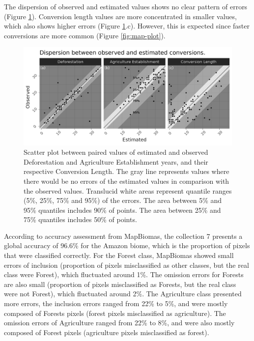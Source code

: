 \documentclass[essd, manuscript]{copernicus}
\begin{document}
The dispersion of observed and estimated values shows no clear pattern of errors (Figure \ref{fig:errorscatter-plot}).
Conversion length values are more concentrated in smaller values, which also shows higher errors (Figure \ref{fig:errorscatter-plot}.c).
However, this is expected since faster conversions are more common (Figure \ref{fig:map-plot}).

\begin{figure}[h]
\includegraphics[width=17cm]{figs/error_scatter} \caption{Scatter plot between paired values of estimated and observed Deforestation and Agriculture Establishment years, and their respective Conversion Length. The gray line represents values where there would be no errors of the estimated values in comparison with the observed values. Translucid white areas represent quantile ranges (5\%, 25\%, 75\% and 95\%) of the errors. The area between 5\% and 95\% quantiles includes 90\% of points. The area between 25\% and 75\% quantiles includes 50\% of points.}\label{fig:errorscatter-plot}
\end{figure}

According to accuracy assessment from MapBiomas, the collection 7 presents a global accuracy of 96.6\% for the Amazon biome, which is the proportion of pixels that were classified correctly.
For the Forest class, MapBiomas showed small errors of inclusion (proportion of pixels misclassified as other classes, but the real class were Forest), which fluctuated around 1\%.
The omission errors for Forests are also small (proportion of pixels misclassified as Forests, but the real class were not Forest), which fluctuated around 2\%.
The Agriculture class presented more errors, the inclusion errors ranged from 22\% to 5\%, and were mostly composed of Forests pixels (forest pixels misclassified as agriculture).
The omission errors of Agriculture ranged from 22\% to 8\%, and were also mostly composed of Forest pixels (agriculture pixels misclassified as forest).
\end{document}
